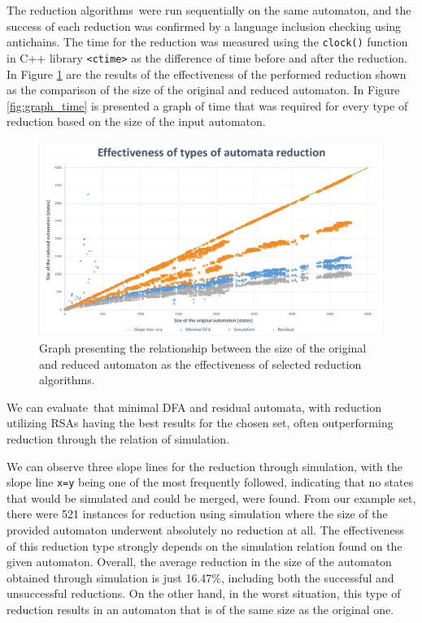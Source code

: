 The reduction algorithms were run sequentially on the same automaton, and the success of each reduction was confirmed by a language inclusion checking using antichains. The time for the reduction was measured using the \texttt{clock()} function in C++ library \texttt{<ctime>} as the difference of time before and after the reduction. In Figure \ref{fig:graph_eff} are the results of the effectiveness of the performed reduction shown as the comparison of the size of the original and reduced automaton. In Figure \ref{fig:graph_time} is presented a graph of time that was required for every type of reduction based on the size of the input automaton.

\begin{figure}[ht]
    \label{fig:graph_eff}
    \centering
    \includegraphics[width=1\linewidth]{obrazky-figures/effectiveness.pdf}
    \caption{Graph presenting the relationship between the size of the original and reduced automaton as the effectiveness of selected reduction algorithms.}
\end{figure}
\vspace{0.3cm}

We can evaluate that minimal DFA and residual automata, with reduction utilizing RSAs having the best results for the chosen set, often outperforming reduction through the relation of simulation.

We can observe three slope lines for the reduction through simulation, with the slope line \texttt{x=y} being one of the most frequently followed, indicating that no states that would be simulated and could be merged, were found. From our example set, there were 521 instances for reduction using simulation where the size of the provided automaton underwent absolutely no reduction at all. The effectiveness of this reduction type strongly depends on the simulation relation found on the given automaton. Overall, the average reduction in the size of the automaton obtained through simulation is just 16.47\%, including both the successful and unsuccessful reductions. On the other hand, in the worst situation, this type of reduction results in an automaton that is of the same size as the original one.

